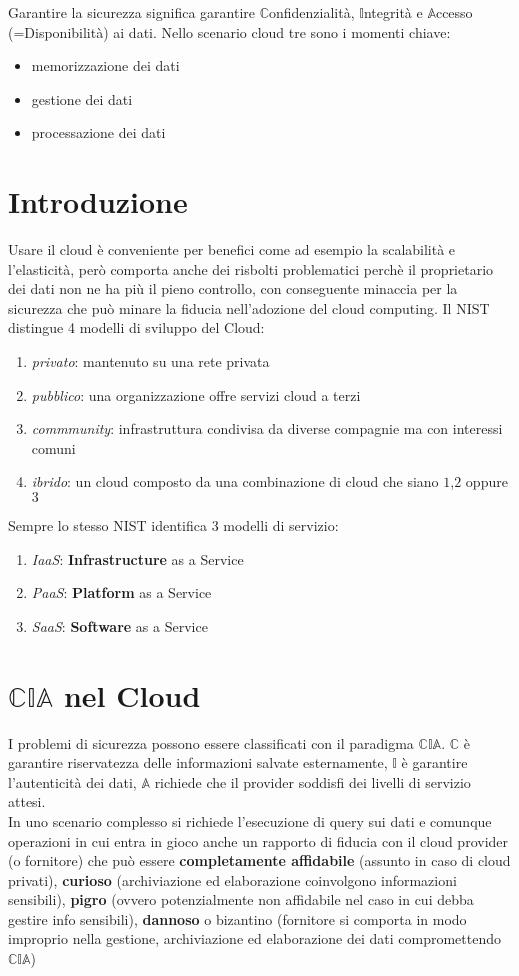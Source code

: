 Garantire la sicurezza significa garantire $\mathbb{C}$onfidenzialità, $\mathbb{I}$ntegrità e $\mathbb{A}$ccesso (=Disponibilità) ai dati. Nello scenario cloud tre sono i momenti chiave:
\begin{itemize}
    \item memorizzazione dei dati
    \item gestione dei dati
    \item processazione dei dati
\end{itemize}
\section{Introduzione}
Usare il cloud è conveniente per benefici come ad esempio la scalabilità e l'elasticità, però comporta anche dei risbolti problematici perchè il proprietario dei dati non ne ha più il pieno controllo, con conseguente minaccia per la sicurezza che può minare la fiducia nell'adozione del cloud computing. Il NIST distingue 4 modelli di sviluppo del Cloud:
\begin{enumerate}
    \item \textit{privato}: mantenuto su una rete privata
    \item \textit{pubblico}: una organizzazione offre servizi cloud a terzi
    \item \textit{commmunity}: infrastruttura condivisa da diverse compagnie ma con interessi comuni
    \item \textit{ibrido}: un cloud composto da una combinazione di cloud che siano $1$,$2$ oppure $3$
\end{enumerate}
Sempre lo stesso NIST identifica 3 modelli di servizio:
\begin{enumerate}
    \item \textit{IaaS}: \textbf{Infrastructure} as a Service
    \item \textit{PaaS}: \textbf{Platform} as a Service
    \item \textit{SaaS}: \textbf{Software} as a Service
\end{enumerate}
\section{$\mathbb{CIA}$ nel Cloud}
I problemi di sicurezza possono essere classificati con il paradigma $\mathbb{CIA}$. $\mathbb{C}$ è garantire riservatezza delle informazioni salvate esternamente, $\mathbb{I}$ è garantire l'autenticità dei dati, $\mathbb{A}$ richiede che il provider soddisfi dei livelli di servizio attesi.\\
In uno scenario complesso si richiede l'esecuzione di query sui dati e comunque operazioni in cui entra in gioco anche un rapporto di fiducia con il cloud provider (o fornitore) che può essere \textbf{completamente affidabile} (assunto in caso di cloud privati), \textbf{curioso} (archiviazione ed elaborazione coinvolgono informazioni sensibili), \textbf{pigro} (ovvero potenzialmente non affidabile nel caso in cui debba gestire info sensibili), \textbf{dannoso} o bizantino (fornitore si comporta in modo improprio nella gestione, archiviazione ed elaborazione dei dati compromettendo $\mathbb{CIA}$)
